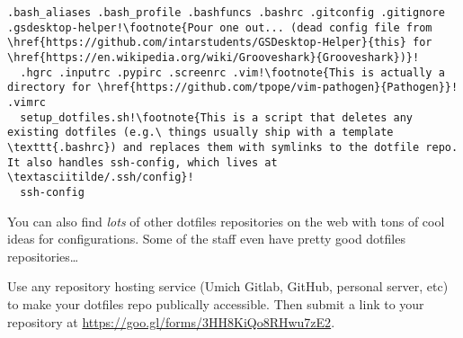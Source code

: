 \documentclass{article}
\begin{document}
\begin{lstlisting}[escapechar=!]
  .bash_aliases .bash_profile .bashfuncs .bashrc .gitconfig .gitignore .gsdesktop-helper!\footnote{Pour one out... (dead config file from \href{https://github.com/intarstudents/GSDesktop-Helper}{this} for \href{https://en.wikipedia.org/wiki/Grooveshark}{Grooveshark})}!
  .hgrc .inputrc .pypirc .screenrc .vim!\footnote{This is actually a directory for \href{https://github.com/tpope/vim-pathogen}{Pathogen}}!  .vimrc
  setup_dotfiles.sh!\footnote{This is a script that deletes any existing dotfiles (e.g.\ things usually ship with a template \texttt{.bashrc}) and replaces them with symlinks to the dotfile repo. It also handles ssh-config, which lives at \textasciitilde/.ssh/config}!
  ssh-config
\end{lstlisting}

You can also find \emph{lots} of other dotfiles repositories on the web with
tons of cool ideas for configurations. Some of the staff even have pretty good
dotfiles repositories\dots

Use any repository hosting service (Umich Gitlab, GitHub, personal server,
etc) to make your dotfiles repo publically accessible. Then submit a link to
your repository at
\href{https://goo.gl/forms/3HH8KiQo8RHwu7zE2}{https://goo.gl/forms/3HH8KiQo8RHwu7zE2}.
\end{document}
